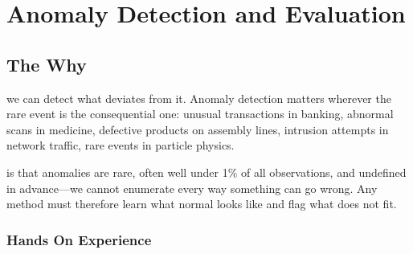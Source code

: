 
\chapter{Anomaly Detection and Evaluation}


\section{The Why}


 we can detect what deviates from it.
Anomaly detection matters wherever the rare event is the consequential one: unusual transactions in banking, abnormal scans in medicine, defective products on assembly lines, intrusion attempts in network traffic, rare events in particle physics.

 is that anomalies are rare, often well under 1\% of all observations, and undefined in advance---we cannot enumerate every way something can go wrong.
Any method must therefore learn what normal looks like and flag what does not fit.

\subsection{Hands On Experience}


